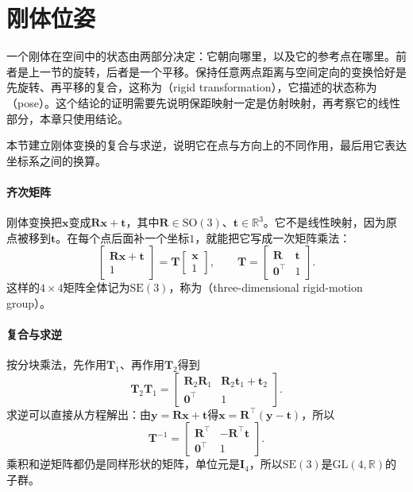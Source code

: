 \section{刚体位姿}
\label{sec:lie-rigid-poses}

一个刚体在空间中的状态由两部分决定：它朝向哪里，以及它的参考点在哪里。前者是上一节的旋转，后者是一个平移。保持任意两点距离与空间定向的变换恰好是先旋转、再平移的复合，这称为（rigid transformation），它描述的状态称为（pose）。这个结论的证明需要先说明保距映射一定是仿射映射，再考察它的线性部分，本章只使用结论。

本节建立刚体变换的复合与求逆，说明它在点与方向上的不同作用，最后用它表达坐标系之间的换算。

\paragraph{齐次矩阵}
刚体变换把$\bm x$变成$\bm R\bm x+\bm t$，其中$\bm R\in\mathrm{SO}(3)$、$\bm t\in\mathbb R^3$。它不是线性映射，因为原点被移到$\bm t$。在每个点后面补一个坐标$1$，就能把它写成一次矩阵乘法：
\begin{equation}
 \begin{bmatrix}\bm R\bm x+\bm t\\1\end{bmatrix}=\bm T\begin{bmatrix}\bm x\\1\end{bmatrix},\qquad
 \bm T=\begin{bmatrix}\bm R&\bm t\\\bm0^\top&1\end{bmatrix}.
 \label{eq:lie-homogeneous-pose}
\end{equation}
这样的$4\times4$矩阵全体记为$\mathrm{SE}(3)$，称为（three-dimensional rigid-motion group）。

\paragraph{复合与求逆}
按分块乘法，先作用$\bm T_1$、再作用$\bm T_2$得到
\begin{equation}
 \bm T_2\bm T_1=\begin{bmatrix}\bm R_2\bm R_1&\bm R_2\bm t_1+\bm t_2\\\bm0^\top&1\end{bmatrix}.
 \label{eq:lie-pose-composition}
\end{equation}
求逆可以直接从方程解出：由$\bm y=\bm R\bm x+\bm t$得$\bm x=\bm R^\top(\bm y-\bm t)$，所以
\begin{equation}
 \bm T^{-1}=\begin{bmatrix}\bm R^\top&-\bm R^\top\bm t\\\bm0^\top&1\end{bmatrix}.
 \label{eq:lie-pose-inverse}
\end{equation}
乘积和逆矩阵都仍是同样形状的矩阵，单位元是$\bm I_4$，所以$\mathrm{SE}(3)$是$\mathrm{GL}(4,\mathbb R)$的子群。

